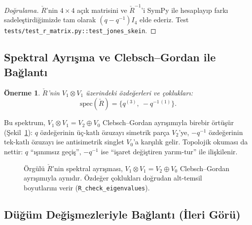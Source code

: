 \documentclass[10pt]{math}
\numberwithin{equation}{section}
\theoremstyle{plain}
\newtheorem{proposition}[theorem]{Önerme}
\theoremstyle{definition}
\newcommand{\Rcheck}{\check{R}}
\begin{document}
\begin{proof}[Doğrulama]
$\check R$'nin $4 \times 4$ açık matrisini ve $\check R^{-1}$'i SymPy
ile hesaplayıp farkı sadeleştirdiğimizde tam olarak
$(q - q^{-1}) I_4$ elde ederiz. Test
\texttt{tests/test\_r\_matrix.py::test\_jones\_skein}.
\end{proof}

\subsection{Spektral Ayrışma ve Clebsch--Gordan ile Bağlantı}

\begin{proposition}\label{prop:eigs}
$\check R$'nin $V_1 \otimes V_1$ üzerindeki özdeğerleri ve çoklukları:
\[
  \mathrm{spec}(\check R) = \{q^{(3)},\ -q^{-1\,(1)}\}.
\]
\end{proposition}

Bu spektrum, $V_1 \otimes V_1 = V_2 \oplus V_0$ Clebsch--Gordan ayrışımıyla
birebir örtüşür (Şekil~\ref{fig:spec}): $q$ özdeğerinin üç-katlı özuzayı simetrik
parça $V_2$'ye, $-q^{-1}$ özdeğerinin tek-katlı özuzayı ise antisimetrik singlet
$V_0$'a karşılık gelir. Topolojik okuması da nettir: $q$ ``ışınımsız geçiş'',
$-q^{-1}$ ise ``işaret değiştiren yarım-tur'' ile ilişkilenir.

\begin{figure}[h]
\centering
{}
\caption{Örgülü $\Rcheck$'nin spektral ayrışması, $V_1\otimes V_1=V_2\oplus V_0$
Clebsch--Gordan ayrışımıyla aynıdır. Özdeğer çoklukları doğrudan alt-temsil
boyutlarını verir (\texttt{R\_check\_eigenvalues}).}
\label{fig:spec}
\end{figure}

\subsection{Düğüm Değişmezleriyle Bağlantı (İleri Görü)}
\end{document}
